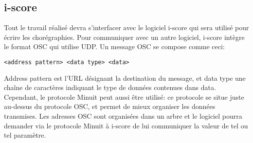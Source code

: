 \subsection{i-score}

Tout le travail réalisé devra s'interfacer avec le logiciel i-score qui sera utilisé pour écrire les chorégraphies. Pour communiquer avec un autre logiciel, i-score intègre le format OSC qui utilise UDP. Un message OSC se compose comme ceci:
\begin{lstlisting}
<address pattern> <data type> <data>
\end{lstlisting}
Address pattern est l'URL désignant la destination du message, et data type une chaîne de caractères indiquant le type de données contenues dans data.
Cependant, le protocole Minuit peut aussi être utilisé: ce protocole se situe juste au-dessus du protocole OSC, et permet de mieux organiser les données transmises. Les adresses OSC sont organisées dans un arbre et le logiciel pourra demander via le protocole Minuit à i-score de lui communiquer la valeur de tel ou tel paramètre.  

